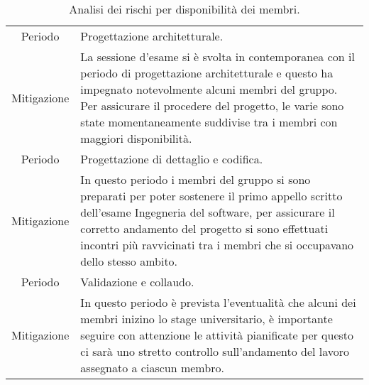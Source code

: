 \begin{table}[H]
	\centering
	\begin{tabular}{|c|p{11.5cm}|}
	\rowcolor{darkblue} \hline
	\multicolumn{2}{|c|}{\textcolor{white}{\textbf{RG2 - Disponibilità dei membri}}}\\ \hline
	Periodo & Progettazione architetturale.\\ \hline
	Mitigazione & La sessione d'esame si è svolta in contemporanea con il periodo di progettazione architetturale e questo ha impegnato notevolmente alcuni membri del gruppo. Per assicurare il procedere del progetto, le varie \glo{attività} sono state momentaneamente suddivise tra i membri con maggiori disponibilità.\\ \hline
	Periodo & Progettazione di dettaglio e codifica.\\ \hline
	Mitigazione & In questo periodo i membri del gruppo si sono preparati per poter sostenere il primo appello scritto dell'esame Ingegneria del software, per assicurare il corretto andamento del progetto si sono effettuati incontri più ravvicinati tra i membri che si occupavano dello stesso ambito.\\ \hline
	Periodo & Validazione e collaudo.\\ \hline
	Mitigazione & In questo periodo è prevista l'eventualità che alcuni dei membri inizino lo stage universitario, è importante seguire con attenzione le attività pianificate per questo ci sarà uno stretto controllo sull'andamento del lavoro assegnato a ciascun membro.\\ \hline
	\end{tabular}
	\caption{\label{tab:ARG2}Analisi dei rischi per disponibilità dei membri.}
\end{table}
